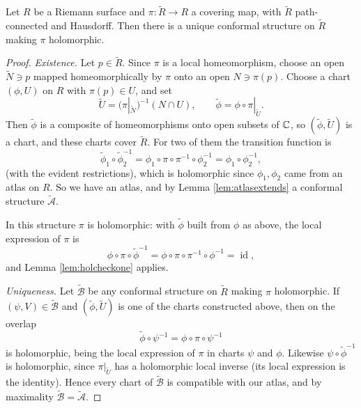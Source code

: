 \documentclass[a4paper]{scrartcl}
\newcommand{\id}{\operatorname{id}}
\begin{document}
\begin{lemma}\label{lem:coverstructure}
	Let $R$ be a Riemann surface and $\pi : \tilde R \to R$ a covering map, with
	$\tilde R$ path-connected and Hausdorff. Then there is a unique conformal structure on
	$\tilde R$ making $\pi$ holomorphic.
\end{lemma}

\begin{proof}
	\emph{Existence.} Let $p \in \tilde R$. Since $\pi$ is a local homeomorphism, choose an
	open $\tilde N \ni p$ mapped homeomorphically by $\pi$ onto an open $N \ni \pi(p)$.
	Choose a chart $(\phi, U)$ on $R$ with $\pi(p) \in U$, and set
	$$
	\tilde U = (\pi|_{\tilde N})^{-1}(N \cap U), \qquad
	\tilde\phi = \phi \circ \pi|_{\tilde U}.
	$$
	Then $\tilde \phi$ is a composite of homeomorphisms onto open subsets of $\mathbb{C}$, so
	$(\tilde\phi, \tilde U)$ is a chart, and these charts cover $\tilde R$. For two of them
	the transition function is
	$$
	\tilde\phi_1 \circ \tilde\phi_2^{-1} = \phi_1 \circ \pi \circ \pi^{-1} \circ \phi_2^{-1} = \phi_1 \circ \phi_2^{-1},
	$$
	(with the evident restrictions), which is holomorphic since $\phi_1, \phi_2$ came from
	an atlas on $R$. So we have an atlas, and by Lemma \ref{lem:atlasextends} a conformal
	structure $\tilde{\mathcal{A}}$.

	In this structure $\pi$ is holomorphic: with $\tilde\phi$ built from $\phi$ as above,
	the local expression of $\pi$ is
	$$
	\phi \circ \pi \circ \tilde\phi^{-1} = \phi\circ \pi \circ \pi^{-1} \circ \phi^{-1} = \id,
	$$
	and Lemma \ref{lem:holcheckone} applies.

	\emph{Uniqueness.} Let $\tilde{\mathcal{B}}$ be any conformal structure on $\tilde R$
	making $\pi$ holomorphic. If $(\psi, V) \in \tilde{\mathcal{B}}$ and $(\tilde\phi, \tilde U)$
	is one of the charts constructed above, then on the overlap
	$$
	\tilde\phi \circ \psi^{-1} = \phi \circ \pi \circ \psi^{-1}
	$$
	is holomorphic, being the local expression of $\pi$ in charts $\psi$ and $\phi$.
	Likewise $\psi \circ \tilde\phi^{-1}$ is holomorphic, since $\pi|_{\tilde U}$ has a
	holomorphic local inverse (its local expression is the identity). Hence every chart of
	$\tilde{\mathcal{B}}$ is compatible with our atlas, and by maximality
	$\tilde{\mathcal{B}} = \tilde{\mathcal{A}}$.
\end{proof}
\end{document}
